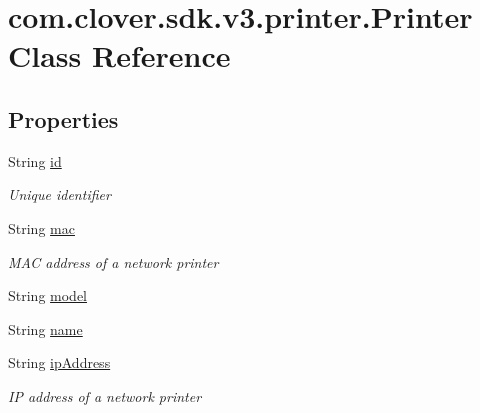 \hypertarget{classcom_1_1clover_1_1sdk_1_1v3_1_1printer_1_1_printer}{}\section{com.\+clover.\+sdk.\+v3.\+printer.\+Printer Class Reference}
\label{classcom_1_1clover_1_1sdk_1_1v3_1_1printer_1_1_printer}
\subsection*{Properties}
\begin{DoxyCompactItemize}
\item 
String \hyperlink{classcom_1_1clover_1_1sdk_1_1v3_1_1printer_1_1_printer_a6c1405e0e17d04064909c54fff864c52}{id}
\begin{DoxyCompactList}\small\item\em Unique identifier \end{DoxyCompactList}\item 
String \hyperlink{classcom_1_1clover_1_1sdk_1_1v3_1_1printer_1_1_printer_a825fc6d7756bc5cd403603cc05f73544}{mac}
\begin{DoxyCompactList}\small\item\em M\+AC address of a network printer \end{DoxyCompactList}\item 
String \hyperlink{classcom_1_1clover_1_1sdk_1_1v3_1_1printer_1_1_printer_aca3a0851adadd2f659cbe38169b5a76e}{model}
\item 
String \hyperlink{classcom_1_1clover_1_1sdk_1_1v3_1_1printer_1_1_printer_a05efe88ab5923d18ab62cb78f958e083}{name}
\item 
String \hyperlink{classcom_1_1clover_1_1sdk_1_1v3_1_1printer_1_1_printer_a25c08767d6d7cb105bf451f458e97c70}{ip\+Address}
\begin{DoxyCompactList}\small\item\em IP address of a network printer \end{DoxyCompactList}\item 

\end{DoxyCompactItemize}
